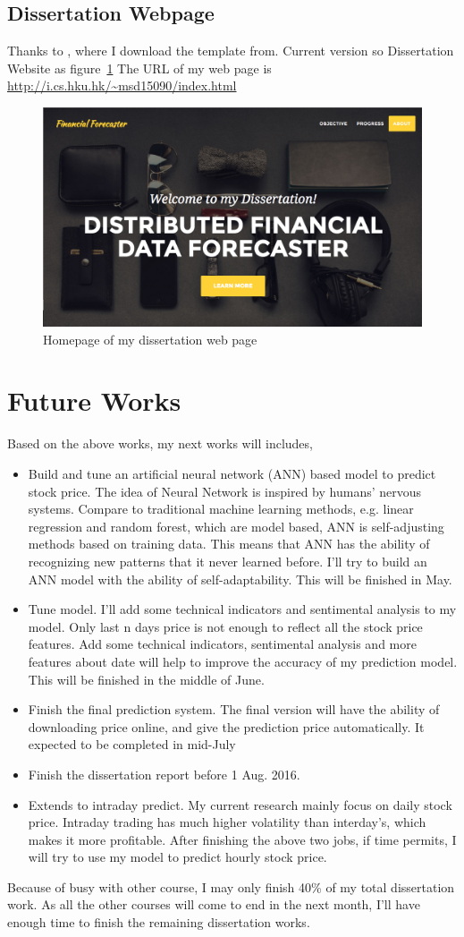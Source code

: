 \documentclass[12pt,a4paper]{scrartcl}
\begin{document}
	\subsection{Dissertation Webpage}
	Thanks to \cite{1_miller_2016}, where I download the template from. Current version so Dissertation Website as figure~\ref{fig:webpage} The URL of my web page is \url{http://i.cs.hku.hk/~msd15090/index.html}
	\begin{figure}[th]
		\centering
		\includegraphics[width=0.6\linewidth]{webpage}
		\caption{Homepage of my dissertation web page}
		\label{fig:webpage}
	\end{figure}
	\section{Future Works}
	Based on the above works, my next works will includes,
	\begin{itemize}
		\item Build and tune an artificial neural network (ANN) based model to predict stock price. The idea of Neural Network is inspired by humans' nervous systems. Compare to traditional machine learning methods, e.g. linear regression and random forest, which are model based, ANN is self-adjusting methods based on training data\cite{kimoto1990stock}. This means that ANN has the ability of recognizing new patterns that it never learned before. I'll try to build an ANN model with the ability of self-adaptability. This will be finished in May.
		\item Tune model. I'll add some technical indicators and sentimental analysis to my model. Only last n days price is not enough to reflect all the stock price features. Add some technical indicators, sentimental analysis and more features about date will help to improve the accuracy of my prediction model. This will be finished in the middle of June.
		\item Finish the final prediction system. The final version will have the ability of downloading price online, and give the prediction price automatically. It expected to be completed in mid-July 
		\item Finish the dissertation report before 1 Aug. 2016.
		\item Extends to intraday predict. My current research mainly focus on daily stock price. Intraday trading has much higher volatility than interday's, which makes it more profitable. After finishing the above two jobs, if time permits, I will try to use my model to predict hourly stock price.
	\end{itemize}
	Because of busy with other course, I may only finish 40\% of my total dissertation work. As all the other courses will come to end in the next month, I'll have enough time to finish the remaining dissertation works. 
	
\end{document}
